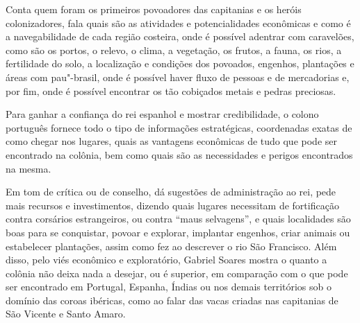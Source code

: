 \documentclass[12pt]{extarticle}
\begin{document}
{Conta quem foram os primeiros povoadores das capitanias e os heróis colonizadores, fala quais são as atividades e potencialidades econômicas e como é a navegabilidade de cada região costeira, onde é possível adentrar com caravelões, como são os portos, o relevo, o clima, a vegetação, os frutos, a fauna, os rios, a fertilidade do solo, a localização e condições dos povoados, engenhos, plantações e áreas com pau"-brasil, onde é possível haver fluxo de pessoas e de mercadorias e, por fim, onde é possível encontrar os tão cobiçados metais e pedras preciosas.

Para ganhar a confiança do rei espanhol e mostrar credibilidade, o colono português fornece todo o tipo de informações estratégicas, coordenadas exatas de como chegar nos lugares, quais as vantagens econômicas de tudo que pode ser encontrado na colônia, bem como quais são as necessidades e perigos encontrados na mesma.

Em tom de crítica ou de conselho, dá sugestões de administração ao rei, pede mais recursos e investimentos, dizendo quais lugares necessitam de fortificação contra corsários estrangeiros, ou contra ``maus selvagens'', e quais localidades são boas para se conquistar, povoar e explorar, implantar engenhos, criar animais ou estabelecer plantações, assim como fez ao descrever o rio São Francisco.
Além disso, pelo viés econômico e exploratório, Gabriel Soares mostra o quanto a colônia não deixa nada a desejar, ou é superior, em comparação com o que pode ser encontrado em Portugal, Espanha, Índias ou nos demais territórios sob o domínio das coroas ibéricas, como ao falar das vacas criadas nas capitanias de São Vicente e Santo Amaro. 




}
\end{document}

